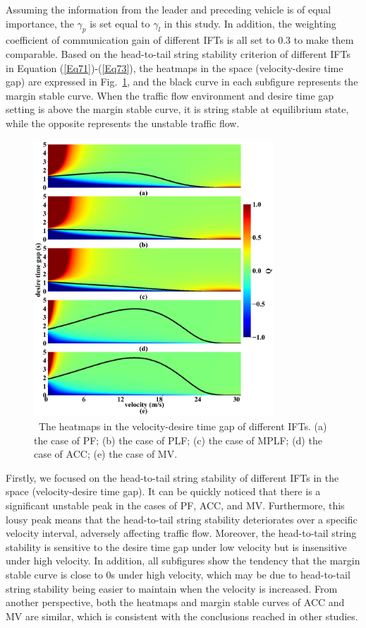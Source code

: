 \documentclass[journal]{IEEEtran}
\begin{document}
Assuming the information from the leader and preceding vehicle is of equal importance, the $\gamma_p$ is set equal to $\gamma_l$ in this study. In addition, the weighting coefficient of communication gain of different IFTs is all set to 0.3 to make them comparable. Based on the head-to-tail string stability criterion of different IFTs in Equation (\ref{Eq71})-(\ref{Eq73}), the heatmaps in the space (velocity-desire time gap) are expressed in Fig.~\ref{Figure3}, and the black curve in each subfigure represents the margin stable curve. When the traffic flow environment and desire time gap setting is above the margin stable curve, it is string stable at equilibrium state, while the opposite represents the unstable traffic flow.

\begin{figure}
\centering
\includegraphics[width=9cm]{fig3.png}
\caption{~The heatmaps in the velocity-desire time gap of different IFTs. (a) the case of PF; (b) the case of PLF; (c) the case of MPLF; (d) the case of ACC; (e) the case of MV.} 
\label{Figure3}
\end{figure}

Firstly, we focused on the head-to-tail string stability of different IFTs in the space (velocity-desire time gap). It can be quickly noticed that there is a significant unstable peak in the cases of PF, ACC, and MV. Furthermore, this lousy peak means that the head-to-tail string stability deteriorates over a specific velocity interval, adversely affecting traffic flow. Moreover, the head-to-tail string stability is sensitive to the desire time gap under low velocity but is insensitive under high velocity. In addition, all subfigures show the tendency that the margin stable curve is close to 0s under high velocity, which may be due to head-to-tail string stability being easier to maintain when the velocity is increased. From another perspective, both the heatmaps and margin stable curves of ACC and MV are similar, which is consistent with the conclusions reached in other studies.
\end{document}
